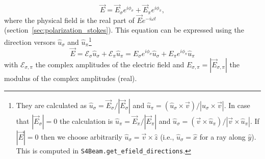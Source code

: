 \documentclass{iucr}
\begin{document}
\begin{equation}\label{eq:electricfieldray}
   \vec{E}= \vec{E}_\sigma e^{i \phi_\sigma} + \vec{E}_\pi e^{i \phi_\pi},
\end{equation}
where the physical field is the real part of $\vec{E}e^{-i\omega t}$ (section~\ref{sec:polarization_stokes}). This equation can be expressed using the direction versors $\hat{u}_\sigma$ and $\hat{u}_\pi$\footnote{
They are calculated as
$\hat{u}_\sigma = \vec{E}_\sigma/|\vec{E}_\sigma|$ and $\hat{u}_\pi = (\hat{u}_\sigma \times \vec{v})/|\hat{u}_\sigma \times \vec{v}|$.
In case that $|\vec{E}_\sigma|=0$ the calculation is $\hat{u}_\pi = \vec{E}_\pi/|\vec{E}_\pi|$ and $\hat{u}_\sigma = (\vec{v} \times \hat{u}_\pi)/|\vec{v} \times \hat{u}_\pi|$. If $|\vec{E}|=0$ then we choose arbitrarily $\hat{u}_\sigma=\vec{v}\times\hat{z}$ (i.e., $\hat{u}_\sigma=\hat{x}$ for a ray along $\hat{y}$). This is computed in {\tt S4Beam.get\_efield\_directions}.
}
\begin{equation}\label{eq:electricfieldray2}
   \vec{E}=
    \mathcal{E}_\sigma \hat{u}_\sigma + 
    \mathcal{E}_\pi \hat{u}_\pi
   =
   E_\sigma e^{i \phi_\sigma} \hat{u}_\sigma + E_\pi e^{i \phi_\pi} \hat{u}_\pi
\end{equation}
with $\mathcal{E}_{\sigma,\pi}$ the complex amplitudes of the electric field and $E_{\sigma,\pi}=|\vec{E}_{\sigma,\pi}|$ the modulus of the complex amplitudes (real).
\end{document}
